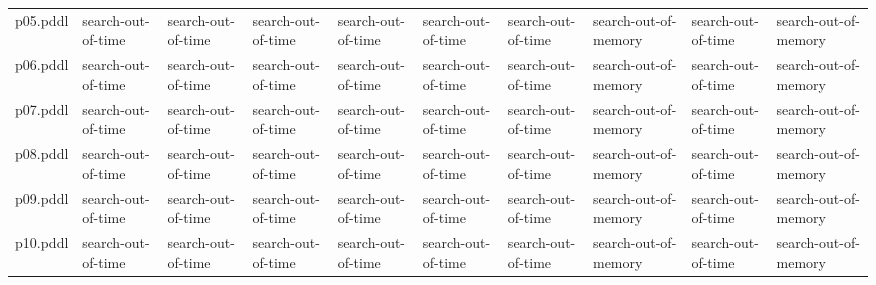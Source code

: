 \documentclass{article}
\begin{document}
\begin{tabular}{@{}lrrrrrrrrr@{}}
p05.pddl & \multicolumn{1}{|l|}{search-out-of-time} & \multicolumn{1}{|l|}{search-out-of-time} & \multicolumn{1}{|l|}{search-out-of-time} & \multicolumn{1}{|l|}{search-out-of-time} & \multicolumn{1}{|l|}{search-out-of-time} & \multicolumn{1}{|l|}{search-out-of-time} & \multicolumn{1}{|l|}{search-out-of-memory} & \multicolumn{1}{|l|}{search-out-of-time} & \multicolumn{1}{|l|}{search-out-of-memory} \\
p06.pddl & \multicolumn{1}{|l|}{search-out-of-time} & \multicolumn{1}{|l|}{search-out-of-time} & \multicolumn{1}{|l|}{search-out-of-time} & \multicolumn{1}{|l|}{search-out-of-time} & \multicolumn{1}{|l|}{search-out-of-time} & \multicolumn{1}{|l|}{search-out-of-time} & \multicolumn{1}{|l|}{search-out-of-memory} & \multicolumn{1}{|l|}{search-out-of-time} & \multicolumn{1}{|l|}{search-out-of-memory} \\
p07.pddl & \multicolumn{1}{|l|}{search-out-of-time} & \multicolumn{1}{|l|}{search-out-of-time} & \multicolumn{1}{|l|}{search-out-of-time} & \multicolumn{1}{|l|}{search-out-of-time} & \multicolumn{1}{|l|}{search-out-of-time} & \multicolumn{1}{|l|}{search-out-of-time} & \multicolumn{1}{|l|}{search-out-of-memory} & \multicolumn{1}{|l|}{search-out-of-time} & \multicolumn{1}{|l|}{search-out-of-memory} \\
p08.pddl & \multicolumn{1}{|l|}{search-out-of-time} & \multicolumn{1}{|l|}{search-out-of-time} & \multicolumn{1}{|l|}{search-out-of-time} & \multicolumn{1}{|l|}{search-out-of-time} & \multicolumn{1}{|l|}{search-out-of-time} & \multicolumn{1}{|l|}{search-out-of-time} & \multicolumn{1}{|l|}{search-out-of-memory} & \multicolumn{1}{|l|}{search-out-of-time} & \multicolumn{1}{|l|}{search-out-of-memory} \\
p09.pddl & \multicolumn{1}{|l|}{search-out-of-time} & \multicolumn{1}{|l|}{search-out-of-time} & \multicolumn{1}{|l|}{search-out-of-time} & \multicolumn{1}{|l|}{search-out-of-time} & \multicolumn{1}{|l|}{search-out-of-time} & \multicolumn{1}{|l|}{search-out-of-time} & \multicolumn{1}{|l|}{search-out-of-memory} & \multicolumn{1}{|l|}{search-out-of-time} & \multicolumn{1}{|l|}{search-out-of-memory} \\
p10.pddl & \multicolumn{1}{|l|}{search-out-of-time} & \multicolumn{1}{|l|}{search-out-of-time} & \multicolumn{1}{|l|}{search-out-of-time} & \multicolumn{1}{|l|}{search-out-of-time} & \multicolumn{1}{|l|}{search-out-of-time} & \multicolumn{1}{|l|}{search-out-of-time} & \multicolumn{1}{|l|}{search-out-of-memory} & \multicolumn{1}{|l|}{search-out-of-time} & \multicolumn{1}{|l|}{search-out-of-memory} \\

\end{tabular}
\end{document}
